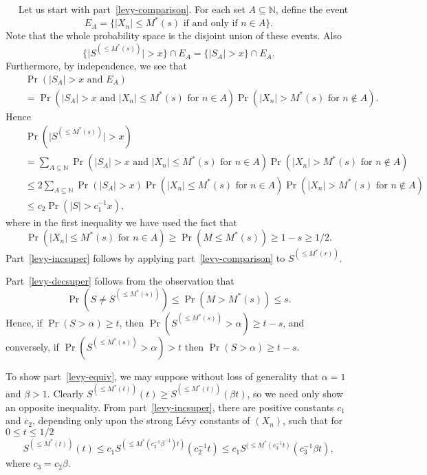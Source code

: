 \documentclass[12pt]{article}
\newcommand{\N}{{\mathbb N}}
\newcommand{\smodo}[1]{{\mathopen|#1\mathclose|}}
\newcommand{\Proof}{\medskip\noindent{\bf Proof:}\ \ }
\begin{document}
\Proof  
Let us start with part~\ref{levy-comparison}.
For each set $A \subseteq \N$, define the event
$$ E_A = \{ \smodo{X_n} \le M^*(s) \text{ if and only if } n \in A \} .$$
Note that the whole probability space is the disjoint union of these
events.  Also
$$ \{ \smodo{S^{(\le M^*(s))}} > x \} \cap E_A
   =
   \{ \smodo{S_A} > x \} \cap E_A .$$
Furthermore, by independence, we see that
\begin{eqnarray*}
   &&\Pr(\smodo{S_A} > x \text{ and } E_A) \\
   &&= \Pr(\smodo{S_A} > x \text{ and } \smodo{X_n} \le M^*(s) 
       \text{ for } n \in A)
       \Pr(\smodo{X_n} > M^*(s) \text{ for } n \notin A) .
\end{eqnarray*}
Hence
\begin{eqnarray*}
  &&\Pr(\smodo{S^{(\le M^*(s))}} > x) \\
  &&= \sum_{A \subseteq \N}
      \Pr(\smodo{S_A} > x \text{ and } \smodo{X_n} \le M^*(s) 
      \text{ for } n \in A)
      \Pr(\smodo{X_n} > M^*(s) \text{ for } n \notin A) \\ 
  &&\le
      2 \sum_{A \subseteq \N}
     \Pr(\smodo{S_A} > x)
     \Pr(\smodo{X_n} \le M^*(s) \text{ for } n \in A) \Pr(\smodo{X_n} >
     M^*(s)
     \text{ for } n \notin A) \\
  &&\le c_2 \Pr(\smodo S > c_1^{-1} x), 
\end{eqnarray*}
where in the first inequality we have used the fact that 
$$ \Pr(\smodo{X_n} \le M^*(s) \text{ for } n \in A) \ge \Pr(M \le M^*(s)) 
\ge 1-s \ge 1/2 .$$ 
Part~\ref{levy-incsuper} follows by applying 
part~\ref{levy-comparison} to $S^{(\le M^*(r))}$.

Part~\ref{levy-decsuper} follows from the observation that $$ 
\Pr(S \ne S^{(\le M^*(s))})\le\Pr(M > M^*(s)) \le s .$$ 
Hence, if $\Pr(S > \alpha) \ge t$, then $\Pr(S^{(\le M^*(s))} >
\alpha) 
\ge t-s$, and conversely, if $\Pr(S^{(\le M^*(s))} > \alpha) > t$ then
$\Pr(S >\alpha) \ge t-s$.

To show 
part~\ref{levy-equiv},
we may suppose without loss of generality that $\alpha=1$ and $\beta > 1$.
Clearly $S^{(\le M^*(t))}(t) \ge S^{(\le M^*(t))}(\beta t)$, so we need
only show an opposite inequality.  From part~\ref{levy-incsuper}, there are
positive
constants $c_1$ and $c_2$, depending only upon the strong L\'evy constants of
$(X_n)$, such that for $0\le t \le 1/2$
$$  S^{(\le M^*(t))}(t) 
    \le c_1 S^{(\le M^*(c_2^{-1}\beta^{-1})t)}(c_2^{-1} t) 
    \le c_1 S^{(\le M^*(c_3^{-1}t)}(c_3^{-1} \beta t) ,$$
where $c_3 = c_2 \beta$.
\end{document}
